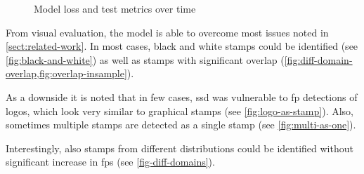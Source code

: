\begin{figure}[htp!]
    \centering
    \begin{subfigure}{.49\linewidth}
        \label{fig:loss}
    \end{subfigure}
    \hfill
    \begin{subfigure}{.49\linewidth}
        \label{fig:map-75}
    \end{subfigure}
    \caption{Model loss and test metrics over time}
\end{figure}

From visual evaluation, the model is able to overcome most issues noted in
\cref{sect:related-work}. In most cases, black and white stamps could be
identified (see \cref{fig:black-and-white}) as well as stamps with significant
overlap (\cref{fig:diff-domain-overlap,fig:overlap-insample}).

As a downside it is noted that in few cases, \gls{ssd} was vulnerable to
\gls{fp} detections of logos, which look very similar to graphical stamps
(see \cref{fig:logo-as-stamp}). Also, sometimes multiple stamps are detected as
a single stamp (see \cref{fig:multi-as-one}).

Interestingly, also stamps from different distributions could be identified without
significant increase in \glspl{fp} (see \cref{fig-diff-domains}).
